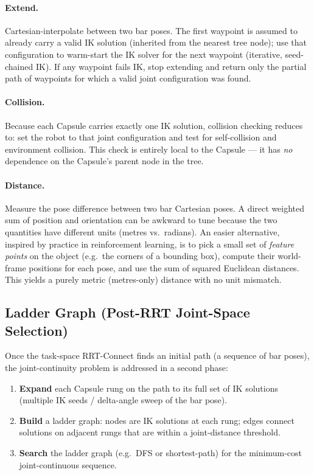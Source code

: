 \documentclass[11pt]{article}
\begin{document}
\paragraph{Extend.}
Cartesian-interpolate between two bar poses.
The first waypoint is assumed to already carry a valid IK solution (inherited from the
nearest tree node); use that configuration to warm-start the IK solver for the next
waypoint (iterative, seed-chained IK).
If any waypoint fails IK, stop extending and return only the partial path of waypoints
for which a valid joint configuration was found.

\paragraph{Collision.}
Because each Capsule carries exactly one IK solution, collision checking reduces to:
set the robot to that joint configuration and test for self-collision and
environment collision.
This check is entirely local to the Capsule — it has \emph{no} dependence on the
Capsule's parent node in the tree.

\paragraph{Distance.}
Measure the pose difference between two bar Cartesian poses.
A direct weighted sum of position and orientation can be awkward to tune because
the two quantities have different units (metres vs.\ radians).
An easier alternative, inspired by practice in reinforcement learning, is to pick a
small set of \emph{feature points} on the object (e.g.\ the corners of a bounding box),
compute their world-frame positions for each pose, and use the sum of squared
Euclidean distances.  This yields a purely metric (metres-only) distance with no unit
mismatch.

\subsection*{Ladder Graph (Post-RRT Joint-Space Selection)}

Once the task-space RRT-Connect finds an initial path (a sequence of bar poses), the
joint-continuity problem is addressed in a second phase:
\begin{enumerate}
  \item \textbf{Expand} each Capsule rung on the path to its full set of IK solutions
        (multiple IK seeds / delta-angle sweep of the bar pose).
  \item \textbf{Build} a ladder graph: nodes are IK solutions at each rung;
        edges connect solutions on adjacent rungs that are within a joint-distance
        threshold.
  \item \textbf{Search} the ladder graph (e.g.\ DFS or shortest-path) for the
        minimum-cost joint-continuous sequence.
\end{enumerate}
\end{document}
